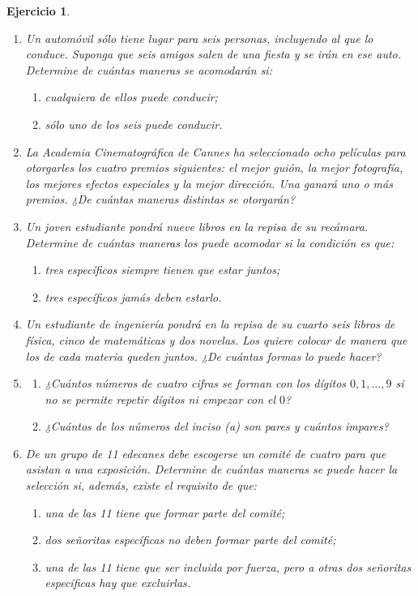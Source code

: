 \documentclass[12pt,twoside]{article}
\newtheorem{Ejer}{Ejercicio}
\begin{document}
\begin{Ejer}
\begin{enumerate}

\item Un automóvil sólo tiene lugar para seis personas, incluyendo al que lo conduce. Suponga que seis amigos salen de una fiesta y se irán en ese auto. Determine de cuántas maneras se acomodarán si:
\begin{enumerate}
\item cualquiera de ellos puede conducir;
\item sólo uno de los seis puede conducir.
\end{enumerate}

\item La Academia Cinematográfica de Cannes ha seleccionado ocho películas para otorgarles los cuatro premios siguientes: el mejor guión, la mejor fotografía, los mejores efectos especiales y la mejor dirección. Una ganará uno o más premios. ¿De cuántas maneras distintas se otorgarán?

\item Un joven estudiante pondrá nueve libros en la repisa de su recámara. Determine de cuántas maneras los puede acomodar si la condición es que:
\begin{enumerate}
\item tres específicos siempre tienen que estar juntos;
\item tres específicos jamás deben estarlo.
\end{enumerate}

\item Un estudiante de ingeniería pondrá en la repisa de su cuarto seis libros de física, cinco de matemáticas y dos novelas. Los quiere colocar de manera que los de cada materia queden juntos. ¿De cuántas formas lo puede hacer?

\item 
\begin{enumerate}
\item ¿Cuántos números de cuatro cifras se forman con los dígitos $0,1,\ldots,9$ si no se permite repetir dígitos ni empezar con el $0$?
\item ¿Cuántos de los números del inciso (a) son pares y cuántos impares?
\end{enumerate}

\item De un grupo de 11 edecanes debe escogerse un comité de cuatro para que asistan a una exposición. Determine de cuántas maneras se puede hacer la selección si, además, existe el requisito de que:
\begin{enumerate}
\item una de las 11 tiene que formar parte del comité;
\item dos señoritas específicas no deben formar parte del comité;
\item una de las 11 tiene que ser incluida por fuerza, pero a otras dos señoritas específicas hay que excluirlas.
\end{enumerate}


\end{enumerate}
\end{Ejer}
\end{document}
